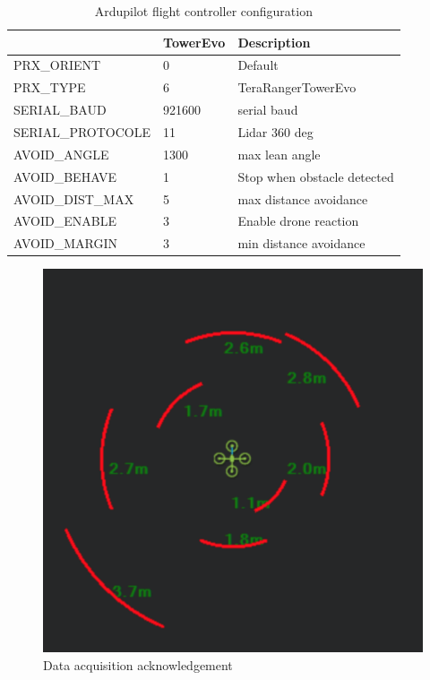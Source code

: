 \begin{table}[H]
    \centering
    \begin{tabular}{|l||l|l|}
    \hline
                      & TowerEvo & Description                 \\
    \hline
    PRX\_ORIENT       & 0        & Default                     \\
    PRX\_TYPE         & 6        & TeraRangerTowerEvo          \\
    SERIAL\_BAUD      & 921600   & serial baud                 \\
    SERIAL\_PROTOCOLE & 11       & Lidar 360 deg               \\
    AVOID\_ANGLE      & 1300     & max  lean angle             \\
    AVOID\_BEHAVE     & 1        & Stop when obstacle detected \\
    AVOID\_DIST\_MAX  & 5        & max distance avoidance      \\
    AVOID\_ENABLE     & 3        & Enable drone reaction       \\
    AVOID\_MARGIN     & 3        & min distance avoidance      \\
    \hline
    \end{tabular}
    \caption{Ardupilot flight controller configuration}
    \label{table:fc_config}
\end{table}

\begin{figure}[H]
    \centering
    \includegraphics[width=0.3\linewidth]{./projects/logviewer/mission_planner_tower_evo.png}
    \caption{Data acquisition acknowledgement}
\end{figure}

